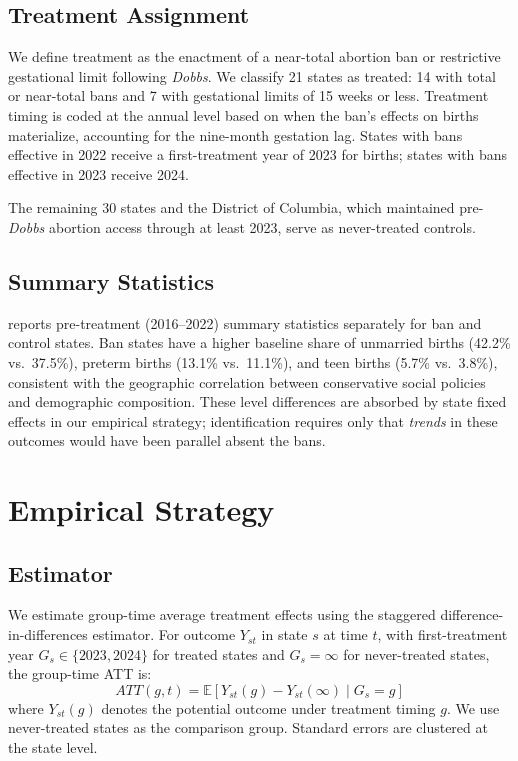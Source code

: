 \documentclass[12pt]{article}
\newcommand{\E}{\mathbb{E}}
\begin{document}
\subsection{Treatment Assignment}

We define treatment as the enactment of a near-total abortion ban or restrictive gestational limit following \emph{Dobbs}. We classify 21 states as treated: 14 with total or near-total bans and 7 with gestational limits of 15 weeks or less. Treatment timing is coded at the annual level based on when the ban's effects on births materialize, accounting for the nine-month gestation lag. States with bans effective in 2022 receive a first-treatment year of 2023 for births; states with bans effective in 2023 receive 2024.

The remaining 30 states and the District of Columbia, which maintained pre-\emph{Dobbs} abortion access through at least 2023, serve as never-treated controls.

\subsection{Summary Statistics}

 reports pre-treatment (2016--2022) summary statistics separately for ban and control states. Ban states have a higher baseline share of unmarried births (42.2\% vs.\ 37.5\%), preterm births (13.1\% vs.\ 11.1\%), and teen births (5.7\% vs.\ 3.8\%), consistent with the geographic correlation between conservative social policies and demographic composition. These level differences are absorbed by state fixed effects in our empirical strategy; identification requires only that \emph{trends} in these outcomes would have been parallel absent the bans.




\section{Empirical Strategy}
\label{sec:strategy}

\subsection{Estimator}

We estimate group-time average treatment effects using the \citet{callaway2021difference} staggered difference-in-differences estimator. For outcome $Y_{st}$ in state $s$ at time $t$, with first-treatment year $G_s \in \{2023, 2024\}$ for treated states and $G_s = \infty$ for never-treated states, the group-time ATT is:
\begin{equation}
ATT(g,t) = \E[Y_{st}(g) - Y_{st}(\infty) \mid G_s = g]
\label{eq:att_gt}
\end{equation}
where $Y_{st}(g)$ denotes the potential outcome under treatment timing $g$. We use never-treated states as the comparison group. Standard errors are clustered at the state level.
\end{document}
